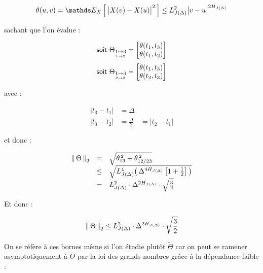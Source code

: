 \begin{equation}
	\theta(u,v) = \esperanceloi X { \bigl| X(v) - X(u) \bigr|^2 } \leq L_{J(\Delta)}^2 \bigl| v - u \bigr|^{2 H_{J(\Delta)}}
\end{equation}

sachant que l'on évalue :

\begin{equation}
	\textsf{soit }
	\Theta_{\underset{1 \rightarrow 2}{1 \rightarrow 3}} = \begin{bmatrix} \theta(t_1, t_3) \\ \theta(t_1, t_2) \end{bmatrix}
\end{equation}
\begin{equation}
	\textsf{soit }
	\Theta_{\underset{2 \rightarrow 3}{1 \rightarrow 3}} = \begin{bmatrix} \theta(t_1, t_3) \\ \theta(t_2, t_3) \end{bmatrix}
\end{equation}


avec :

\begin{equation}
	\begin{array}{ccc}
		|t_3 - t_1| & = \Delta
		\\
		|t_3 - t_2| & = \frac \Delta 2 & = |t_2 - t_1|
	\end{array}\label{eq:couples_diff_delta_value}
\end{equation}

et donc :

\begin{equation}
	\displaystyle
	\begin{array}{rclr}
		\left\lVert \, \Theta \, \right\rVert _ {2} & =    & \sqrt{\theta_{13}^{\,2} + \theta_{12/23}^{\, 2}}
		\\
		                & \leq & \sqrt{ L_{J(\Delta)}^4 \bigl( \, \Delta^{4 H_{J(\Delta)}} \left[ 1 + \frac 1 2 \right]  \, \bigr) }
		\\
		                & =    & L_{J(\Delta)}^2 \cdot \Delta^{2H_{J(\Delta)}} \cdot \sqrt{\frac 3 2}
	\end{array}
\end{equation}

Et donc :

\begin{equation*}
	\left\lVert \, \Theta \, \right\rVert _ {2} \leq L_{J(\Delta)}^2 \cdot \Delta^{2H_{J(\Delta)}} \cdot \sqrt{\frac 3 2}
\end{equation*}

On se réfère à ces bornes même si l'on étudie plutôt $\widetilde \Theta$ car on peut se ramener asymptotiquement à $\Theta$ par la loi des grands nombres grâce à la dépendance faible :

